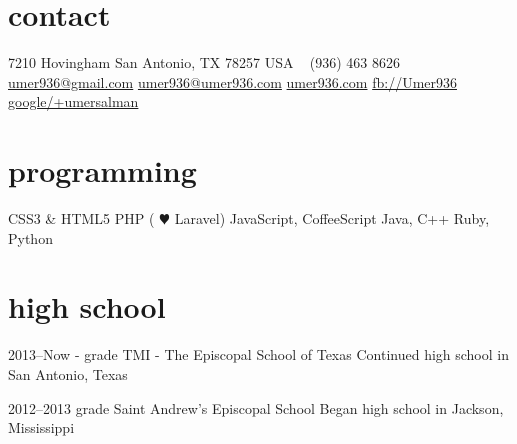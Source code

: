 \documentclass[]{friggeri-cv} %
\begin{document}


\begin{aside} %
\section{contact}
7210 Hovingham 
San Antonio, TX 78257
USA 
~
(936) 463 8626
~
\href{mailto:umer936@gmail.com}{umer936@gmail.com}
\href{mailto:umer936@umer936.com}{umer936@umer936.com}
\href{http://umer936.com}{umer936.com}
\href{http://facebook.com/Umer936}{fb://Umer936}
\href{http://google.com/+umersalman}{google/+umersalman}
~ 
\section{programming}
CSS3 \& HTML5 
PHP ({\color{red} $\varheartsuit$} Laravel) 
JavaScript, CoffeeScript  
Java, C++ 
Ruby, Python 
~
\end{aside}


\section{high school}

\begin{entrylist}


\entry
{2013--Now}
{- {\normalfont grade}}
{TMI - The Episcopal School of Texas}
{Continued high school in San Antonio, Texas}


\entry
{2012--2013}
{ {\normalfont grade}}
{Saint Andrew's Episcopal School}
{Began high school in Jackson, Mississippi}


\end{entrylist}
\end{document}
